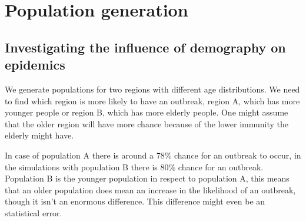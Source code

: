 \documentclass[runningheads]{llncs}
\begin{document}
\newpage
\noindent
\section{Population generation}

\subsection{Investigating the influence of demography on epidemics}
We generate populations for two regions with different age distributions. We need to find which region is more likely to have an outbreak, region A, which has more younger people or region B, which has more elderly people. One might assume that the older region will have more chance because of the lower immunity the elderly might have.

In case of population A there is around a 78\% chance for an outbreak to occur, in the simulations with population B there is 80\% chance for an outbreak. Population B is the younger population in respect to population A, this means that an older population does mean an increase in the likelihood of an outbreak, though it isn't an enormous difference. This difference might even be an statistical error.
\end{document}
